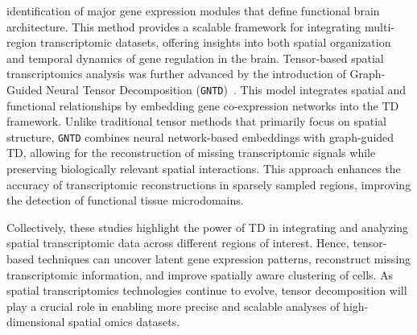 identification of major gene expression modules that define functional brain architecture. This method provides a scalable framework for integrating multi-region transcriptomic datasets, offering insights into both spatial organization and temporal dynamics of gene regulation in the brain. Tensor-based spatial transcriptomics analysis was further advanced by the introduction of Graph-Guided Neural Tensor Decomposition (\texttt{GNTD})~\cite{song2023gntd}.  This model integrates spatial and functional relationships by embedding gene co-expression networks into the TD framework. Unlike traditional tensor methods that primarily focus on spatial structure, \texttt{GNTD} combines neural network-based embeddings with graph-guided TD, allowing for the reconstruction of missing transcriptomic signals while preserving biologically relevant spatial interactions. This approach enhances the accuracy of transcriptomic reconstructions in sparsely sampled regions, improving the detection of functional tissue microdomains.

Collectively, these studies highlight the power of TD in integrating and analyzing spatial transcriptomic data across different regions of interest. Hence, tensor-based techniques can uncover latent gene expression patterns, reconstruct missing transcriptomic information, and improve spatially aware clustering of cells. As spatial transcriptomics technologies continue to evolve, tensor decomposition will play a crucial role in enabling more precise and scalable analyses of high-dimensional spatial omics datasets.


